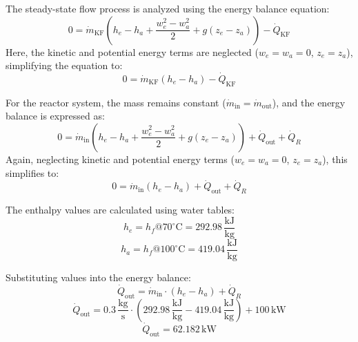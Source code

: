 The steady-state flow process is analyzed using the energy balance equation:  
\[
0 = \dot{m}_{\text{KF}} \left( h_e - h_a + \frac{w_e^2 - w_a^2}{2} + g(z_e - z_a) \right) - \dot{Q}_{\text{KF}}
\]  
Here, the kinetic and potential energy terms are neglected (\( w_e = w_a = 0 \), \( z_e = z_a \)), simplifying the equation to:  
\[
0 = \dot{m}_{\text{KF}} (h_e - h_a) - \dot{Q}_{\text{KF}}
\]  

For the reactor system, the mass remains constant (\( \dot{m}_{\text{in}} = \dot{m}_{\text{out}} \)), and the energy balance is expressed as:  
\[
0 = \dot{m}_{\text{in}} \left( h_e - h_a + \frac{w_e^2 - w_a^2}{2} + g(z_e - z_a) \right) + \dot{Q}_{\text{out}} + \dot{Q}_R
\]  
Again, neglecting kinetic and potential energy terms (\( w_e = w_a = 0 \), \( z_e = z_a \)), this simplifies to:  
\[
0 = \dot{m}_{\text{in}} (h_e - h_a) + \dot{Q}_{\text{out}} + \dot{Q}_R
\]  

The enthalpy values are calculated using water tables:  
\[
h_e = h_f @ 70^\circ\text{C} = 292.98 \, \frac{\text{kJ}}{\text{kg}}
\]  
\[
h_a = h_f @ 100^\circ\text{C} = 419.04 \, \frac{\text{kJ}}{\text{kg}}
\]  

Substituting values into the energy balance:  
\[
\dot{Q}_{\text{out}} = \dot{m}_{\text{in}} \cdot (h_e - h_a) + \dot{Q}_R
\]  
\[
\dot{Q}_{\text{out}} = 0.3 \, \frac{\text{kg}}{\text{s}} \cdot (292.98 \, \frac{\text{kJ}}{\text{kg}} - 419.04 \, \frac{\text{kJ}}{\text{kg}}) + 100 \, \text{kW}
\]  
\[
\dot{Q}_{\text{out}} = 62.182 \, \text{kW}
\]